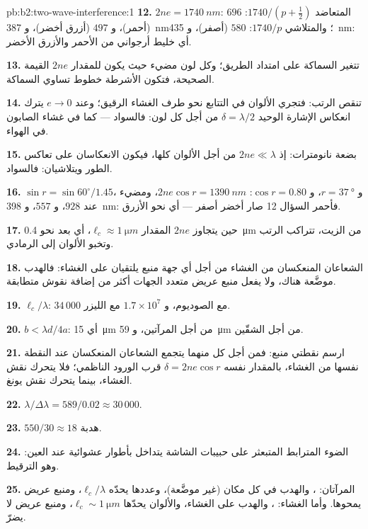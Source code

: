 \begin{solution}{pb:b2:two-wave-interference:1}
\textbf{12.} $2ne = \qty{1740}{nm}$: المتعاضد $1740/(p + \tfrac12)$: $696$ (أحمر)، و $497$
(أزرق أخضر)، و \qty{387}{nm}؛ والمتلاشي $1740/p$: $580$ (أصفر)، و \qty{435}{nm}:
أي خليط أرجواني من الأحمر والأزرق الأخضر.

\textbf{13.} تتغير السماكة على امتداد الطريق؛ وكل لون مضيء
حيث يكون للمقدار $2ne$ القيمة الصحيحة، فتكون الأشرطة خطوط تساوي
السماكة.

\textbf{14.} تنقص الرتب: فتجري الألوان في التتابع
نحو طرف الغشاء الرقيق؛ وعند $e \to 0$ يترك انعكاس الإشارة الوحيد
$\delta = \lambda/2$ من أجل كل لون: فالسواد --- كما في غشاء الصابون في الهواء.

\textbf{15.} بضعة نانومترات: إذ $2ne \ll \lambda$ من أجل الألوان كلها، فيكون
الانعكاسان على تعاكس الطور ويتلاشيان: فالسواد.

\textbf{16.} $\sin r = \sin60^\circ/1.45$، و $r = \qty{37}{\degree}$، و $\cos r = 0.80$: $2ne\cos r
= \qty{1390}{nm}$، ومضيء عند $928$، و $557$، و \qty{398}{nm}: فأحمر السؤال 12
صار أخضر أصفر --- أي نحو الأزرق.

\textbf{17.} حين يتجاوز $2ne$ المقدار $\ell_c \approx \qty{1}{\micro m}$، أي بعد نحو
\qty{0.4}{\micro m} من الزيت، تتراكب الرتب وتخبو الألوان إلى الرمادي.

\textbf{18.} الشعاعان المنعكسان من الغشاء من أجل أي جهة منبع
يلتقيان على الغشاء: فالهدب موضَّعة هناك، ولا يفعل منبع عريض
متعدد الجهات أكثر من إضافة نقوش متطابقة.

\textbf{19.} $\ell_c/\lambda$: $34\,000$ مع الصوديوم، و $1.7 \times 10^7$ مع الليزر.

\textbf{20.} $b < \lambda d/4a$: أي \qty{15}{\micro m} من أجل المرآتين، و \qty{59}{\micro m} من أجل
الشقّين.

\textbf{21.} ارسم نقطتي منبع: فمن أجل كل منهما يتجمع الشعاعان المنعكسان
عند النقطة نفسها من الغشاء، بالمقدار نفسه $\delta = 2ne\cos r$
قرب الورود الناظمي؛ فلا يتحرك نقش الغشاء، بينما يتحرك نقش يونغ.

\textbf{22.} $\lambda/\Delta\lambda = 589/0.02 \approx 30\,000$.

\textbf{23.} $550/30 \approx 18$ هدبة.

\textbf{24.} الضوء المترابط المتبعثر على حبيبات الشاشة يتداخل
بأطوار عشوائية عند العين: وهو الترقيط.

\textbf{25.} المرآتان: ، والهدب في كل مكان
(غير موضَّعة)، وعددها يحدّه $\ell_c/\lambda$، ومنبع عريض يمحوها.
وأما الغشاء: ، والهدب على الغشاء، والألوان
يحدّها $\ell_c \sim \qty{1}{\micro m}$، ومنبع عريض لا يضرّ.
\end{solution}

